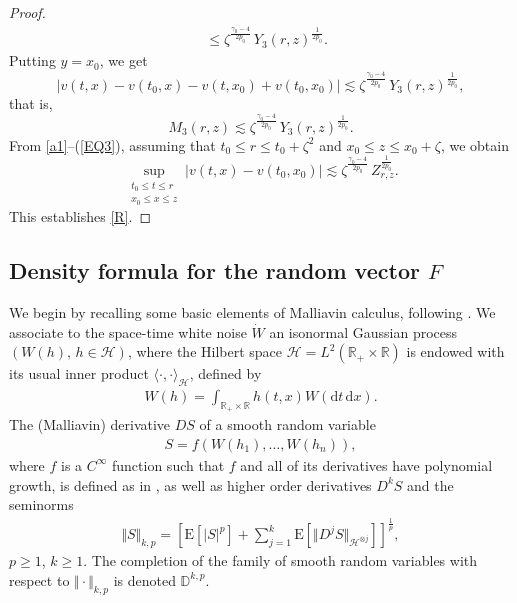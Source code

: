 \documentclass[12pt,a4paper]{article}
\newcommand{\bD}{{\mathbb{D}}}
\newcommand{\R}{{\mathbb{R}}}
\newcommand{\E}{\mathrm{E}}
\newcommand{\HH}{\mathcal{H}}
\renewcommand{\d}{\mathrm{d}}
\newcommand {\deltah}{{\zeta}}
\newcommand{\<}{\langle}
\renewcommand{\>}{\rangle}
\begin{document}
\begin{proof}
\begin{align*}
 &\le  \deltah ^{\frac {\gamma_0-4}{2p_0}} \, Y_3(r,z)^{\frac 1{2p_0}} .
 \end{align*}
 Putting $y=x_0$, we get
   \begin{equation*} %
 |v(t,x)-v(t_0,x)-v(t,x_0)+v(t_0,x_0)| \lesssim
  \deltah ^{\frac {\gamma_0-4}{2p_0}} \, Y_3(r,z)^{\frac 1{2p_0}},
 \end{equation*}
 that is,
    \begin{equation} \label{EQ3}
    M_3(r, z) \lesssim \deltah ^{\frac {\gamma_0-4}{2p_0}} \, Y_3(r,z)^{\frac 1{2p_0}}.
 \end{equation}
 From \eqref{a1}--(\ref{EQ3}),  assuming that   $t_0 \le r\le t_0+\deltah^2$ and $x_0\le z\le x_0+\deltah$, we obtain
  \[
 \sup _{\substack {t_0\le t \le r \\
x_0\le x \le z}} |v(t,x)-v(t_0,x_0)| \lesssim     \deltah ^{\frac {\gamma_0-4}{2p_0}}\,
 Z_{r,z}^{\frac 1{2p_0}}.
 \]
 This establishes \eqref{R}.
 \end{proof}
 
 
 \subsection{Density formula for the random vector $F$}
 
 We begin by recalling some basic elements of Malliavin calculus, following \cite{nualart2006}. 
 We associate to the space-time white noise $\dot W$ an isonormal Gaussian process $(W(h),\, h \in \HH)$, where the Hilbert space $\HH = L^2(\R_+ \times \R)$ is endowed with its usual inner product $\langle \cdot, \cdot \rangle_\HH$, defined by
 \begin{align*}
      W(h) = \int_{\R_+ \times \R} h(t, x) W(\d t\, \d x). 
 \end{align*}
 The (Malliavin) derivative $D S$ of a smooth random variable 
 \begin{align*}
    S = f(W(h_1),\dots,W(h_n)), 
\end{align*}
where $f$ is a $C^\infty$ function such that $f$ and all of its derivatives have polynomial growth, is defined as in \cite[Section 1.2 \& 1.2.1]{nualart2006}, as well as higher order derivatives $D^k S$ and the seminorms
 \begin{align*}
    \Vert S \Vert_{k, p} = \left[ \E[\vert S \vert^p] + \sum_{j=1}^k  \E\left[\Vert D^j S \Vert_{\HH^{\otimes j}} \right]\right]^{\frac{1}{p}},
 \end{align*}
 $p \geq 1$, $k\geq 1$. The completion of the family of smooth random variables with respect to $\Vert \cdot \Vert_{k, p} $ is denoted $\bD^{k, p}$.
 
\end{document}
